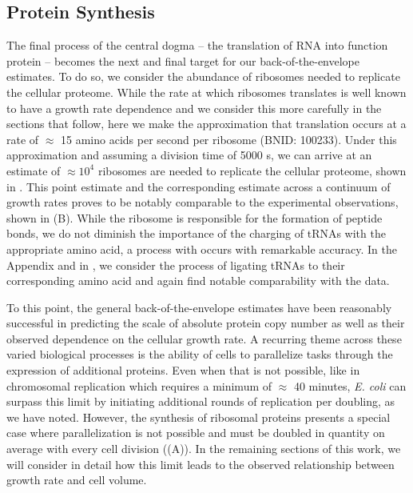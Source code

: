\subsection{Protein Synthesis}
The final process of the central dogma -- the translation of RNA into function
protein -- becomes the next and final target for our back-of-the-envelope
estimates. To do so, we consider the abundance of ribosomes needed to replicate
the cellular proteome.  While the rate at which ribosomes
translates is well known to have a growth rate dependence \cite{dai2018} and
we consider this more carefully in the sections that follow, here we make the
approximation that translation occurs at a rate of $\approx$ 15 amino acids
per second per ribosome (BNID: 100233). Under this approximation and assuming
a division time of 5000 s, we can arrive at an estimate of $\approx 10^4$
ribosomes are needed to replicate the cellular proteome, shown in
. This point estimate and the corresponding estimate
across a continuum of growth rates proves to be notably comparable
to the experimental observations, shown in (B).
While the ribosome is responsible for the formation of peptide bonds, we do not
diminish the importance of the charging of tRNAs with the appropriate amino
acid, a process with occurs with remarkable accuracy. In the Appendix and in , we consider
the process of ligating tRNAs to their corresponding amino acid and again find
notable comparability with the data.

To this point, the general back-of-the-envelope estimates have been reasonably
successful in predicting the scale of absolute protein copy number as well as
their observed dependence on the cellular growth rate. A recurring theme across
these varied biological processes is the ability of cells to  parallelize tasks
through the expression of additional proteins.  Even when that is not possible,
like in chromosomal replication which  requires a minimum of $\approx$ 40
minutes, \textit{E. coli} can surpass this limit by initiating additional rounds
of replication per doubling, as we have noted. However, the synthesis of
ribosomal proteins presents a special case where parallelization is not possible
and must be doubled in quantity on average with every cell division
((A)). In the remaining sections of this work, we will
consider in detail how this limit leads to the observed relationship between
growth rate and cell volume.



